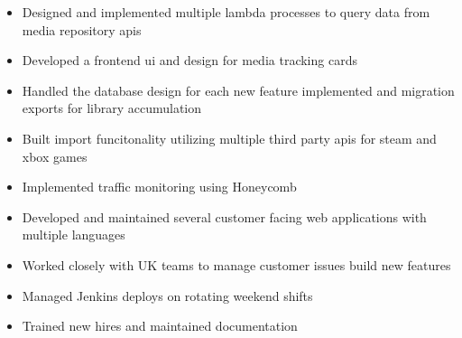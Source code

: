 \documentclass[10pt,a4paper,ragged2e]{altacv}
\begin{document}

\begin{fullwidth}
\makecvheader
\end{fullwidth}



\begin{itemize}
\item Designed and implemented multiple lambda processes to query data from media repository apis
\item Developed a frontend ui and design for media tracking cards 
\item Handled the database design for each new feature implemented and migration exports for library accumulation
\item Built import funcitonality utilizing multiple third party apis for steam and xbox games
\item Implemented traffic monitoring using Honeycomb
\end{itemize}

\divider

\begin{itemize}
\item Developed and maintained several customer facing web applications with multiple languages
\item Worked closely with UK teams to manage customer issues build new features
\item Managed Jenkins deploys on rotating weekend shifts
\item Trained new hires and maintained documentation
\end{itemize}
\end{document}
